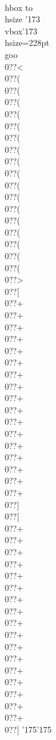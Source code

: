 \vfil
{\seventtt\parindent=0pt\baselineskip=9pt\obeylines
\def\[{{\char'173}}
\def\]{{\char'175}}
\\hbox to \\hsize \[\\vbox\[\\hsize=228pt\\goo
\\0??<\\0??(\\0??(\\0??(\\0??(\\0??(\\0??(\\0??(\\0??(\\0??(\\0??(\\0??(\\0??(\\0??(\\0??(\\0??(\\0??(\\0??(\\0??>
\\0??[\\0??+\\0??+\\0??+\\0??+\\0??+\\0??+\\0??+\\0??+\\0??+\\0??+\\0??+\\0??+\\0??+\\0??+\\0??+\\0??+\\0??+\\0??]
\\0??[\\0??+\\0??+\\0??+\\0??+\\0??+\\0??+\\0??+\\0??+\\0??+\\0??+\\0??+\\0??+\\0??+\\0??+\\0??+\\0??+\\0??+\\0??]
\]\]}
